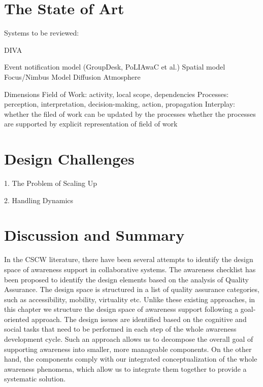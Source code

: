 \section{The State of Art} %
\label{sec:the_state_of_art}

Systems to be reviewed:

DIVA \cite{springerlink:10.1023/A:1008608425504}

Event notification model (GroupDesk, PoLIAwaC et al.)
Spatial model
Focus/Nimbus Model
Diffusion
Atmosphere

Dimensions
Field of Work: activity, local scope, dependencies
Processes: perception, interpretation, decision-making, action, propagation
Interplay: 
whether the filed of work can be updated by the processes
whether the processes are supported by explicit representation of field of work


\section{Design Challenges} %
\label{sec:design_challenges}
1. The Problem of Scaling Up

2. Handling Dynamics



\section{Discussion and Summary} %
\label{sec:discussion_and_summary}
In the CSCW literature, there have been several attempts to identify the design space of awareness support in collaborative systems. The awareness checklist \cite{antunes2010a} has been proposed to identify the design elements based on the analysis of Quality Assurance. The design space is structured in a list of quality assurance categories, such as accessibility, mobility, virtuality etc. Unlike these existing approaches, in this chapter we structure the design space of awareness support following a goal-oriented approach. The design issues are identified based on the cognitive and social tasks that need to be performed in each step of the whole awareness development cycle. Such an approach allows us to decompose the overall goal of supporting awareness into smaller, more manageable components. On the other hand, the components comply with our integrated conceptualization of the whole awareness phenomena, which allow us to integrate them together to provide a systematic solution.

